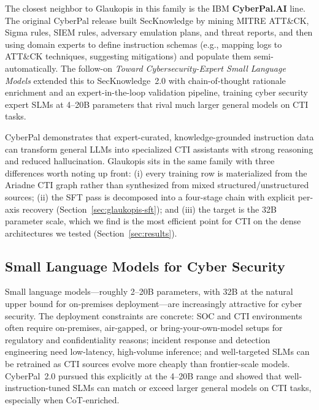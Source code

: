 \documentclass[webpdf,contemporary,large]{oup-authoring-template}
\theoremstyle{thmstyleone}
\theoremstyle{thmstyletwo}
\theoremstyle{thmstylethree}
\begin{document}
The closest neighbor to Glaukopis in this family is the IBM \textbf{CyberPal.AI} line. The original CyberPal release \cite{levi2024cyberpal} built SecKnowledge by mining MITRE ATT\&CK, Sigma rules, SIEM rules, adversary emulation plans, and threat reports, and then using domain experts to define instruction schemas (e.g., mapping logs to ATT\&CK techniques, suggesting mitigations) and populate them semi-automatically. The follow-on \emph{Toward Cybersecurity-Expert Small Language Models} \cite{levi2025toward} extended this to SecKnowledge~2.0 with chain-of-thought rationale enrichment and an expert-in-the-loop validation pipeline, training cyber security expert SLMs at 4--20B parameters that rival much larger general models on CTI tasks.

CyberPal demonstrates that expert-curated, knowledge-grounded instruction data can transform general LLMs into specialized CTI assistants with strong reasoning and reduced hallucination. Glaukopis sits in the same family with three differences worth noting up front: (i) every training row is materialized from the Ariadne CTI graph rather than synthesized from mixed structured/unstructured sources; (ii) the SFT pass is decomposed into a four-stage chain with explicit per-axis recovery (Section~\ref{sec:glaukopis-sft}); and (iii) the target is the 32B parameter scale, which we find is the most efficient point for CTI on the dense architectures we tested (Section~\ref{sec:results}).

\subsection{Small Language Models for Cyber Security}
\label{sec:ift-slm-cyber}

Small language models---roughly 2--20B parameters, with 32B at the natural upper bound for on-premises deployment---are increasingly attractive for cyber security. The deployment constraints are concrete: SOC and CTI environments often require on-premises, air-gapped, or bring-your-own-model setups for regulatory and confidentiality reasons; incident response and detection engineering need low-latency, high-volume inference; and well-targeted SLMs can be retrained as CTI sources evolve more cheaply than frontier-scale models. CyberPal~2.0 \cite{levi2025toward} pursued this explicitly at the 4--20B range and showed that well-instruction-tuned SLMs can match or exceed larger general models on CTI tasks, especially when CoT-enriched.
\end{document}
